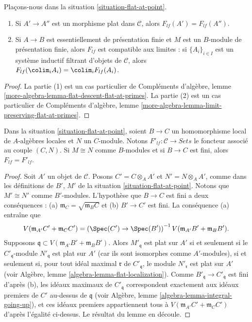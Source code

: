 \begin{lemma}
\label{lemma-flat-at-point}
Plaçons-nous dans la situation \ref{situation-flat-at-point}.
\begin{enumerate}
\item Si $A' \to A''$ est un morphisme plat dans $\mathcal{C}$,
alors $F_{lf}(A') = F_{lf}(A'')$.
\item Si $A \to B$ est essentiellement de présentation finie et
$M$ est un $B$-module de présentation finie, alors $F_{lf}$ est compatible aux
limites : si $\{A_i\}_{i \in I}$ est un
système inductif filtrant d'objets de $\mathcal{C}$, alors
$F_{lf}(\colim_i A_i) = \colim_i F_{lf}(A_i)$.
\end{enumerate}
\end{lemma}

\begin{proof}
La partie (1) est un cas particulier de
Compléments d'algèbre,
lemme \ref{more-algebra-lemma-flat-descent-flat-at-primes}.
La partie (2) est un cas particulier de
Compléments d'algèbre,
lemme \ref{more-algebra-lemma-limit-preserving-flat-at-primes}.
\end{proof}

\begin{lemma}
\label{lemma-flat-at-point-finite}
Dans la situation \ref{situation-flat-at-point}, soient $B \to C$ un homomorphisme local de
$A$-algèbres locales et $N$ un $C$-module. Notons
$F'_{lf} : \mathcal{C} \to \textit{Sets}$ le foncteur associé au couple
$(C, N)$. Si $M \cong N$ comme $B$-modules et si $B \to C$ est fini, alors
$F_{lf} = F'_{lf}$.
\end{lemma}

\begin{proof}
Soit $A'$ un objet de $\mathcal{C}$. Posons $C' = C \otimes_A A'$
et $N' = N \otimes_A A'$, comme dans les définitions de $B'$, $M'$ de la
situation \ref{situation-flat-at-point}.
Notons que $M' \cong N'$ comme $B'$-modules.
L'hypothèse que $B \to C$ est fini a deux conséquences :
(a) $\mathfrak m_C = \sqrt{\mathfrak m_B C}$ et (b)
$B' \to C'$ est fini. La conséquence (a) entraîne que
$$
V(\mathfrak m_{A'}C' + \mathfrak m_C C')
=
\left(
\Spec(C') \to \Spec(B')
\right)^{-1}V(\mathfrak m_{A'}B' + \mathfrak m_B B').
$$
Supposons $\mathfrak q \subset V(\mathfrak m_{A'}B' + \mathfrak m_B B')$.
Alors $M'_{\mathfrak q}$ est plat sur $A'$ si et seulement si
le $C'_{\mathfrak q}$-module $N'_{\mathfrak q}$ est plat sur $A'$
(car ils sont isomorphes comme $A'$-modules), si et seulement si,
pour tout idéal maximal $\mathfrak r$ de $C'_{\mathfrak q}$,
le module $N'_{\mathfrak r}$ est plat sur $A'$ (voir
Algèbre, lemme \ref{algebra-lemma-flat-localization}).
Comme $B'_{\mathfrak q} \to C'_{\mathfrak q}$ est fini d'après (b),
les idéaux maximaux de $C'_{\mathfrak q}$ correspondent exactement
aux idéaux premiers de $C'$ au-dessus de $\mathfrak q$ (voir
Algèbre, lemme \ref{algebra-lemma-integral-going-up}),
et ces idéaux premiers appartiennent tous à
$V(\mathfrak m_{A'}C' + \mathfrak m_C C')$ d'après
l'égalité ci-dessus. Le résultat du lemme en découle.
\end{proof}

